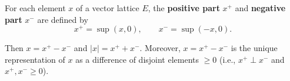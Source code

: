 For each element $x$ of a vector lattice $E$, the \textbf{positive part} $x^+$ and \textbf{negative part} $x^-$ are defined by
$$x^+ = \sup(x, 0), \qquad x^- = \sup(-x, 0).$$

Then $x = x^+ - x^-$ and $|x| = x^+ + x^-$. Moreover, $x = x^+ - x^-$ is the unique representation of $x$ as a difference of disjoint elements $\geq 0$ (i.e., $x^+ \perp x^-$ and $x^+, x^- \geq 0$).
